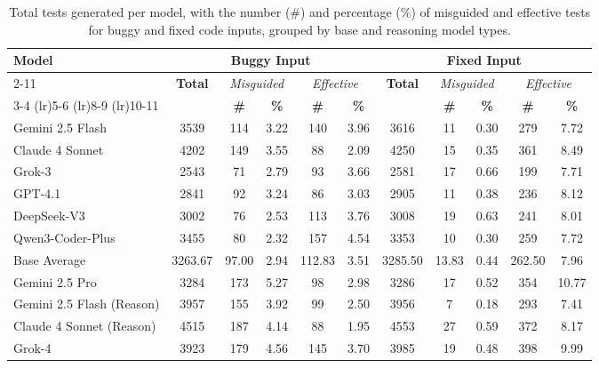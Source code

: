 \documentclass[acmsmall]{acmart}
\begin{document}
\begin{table}[htbp!]
\vspace{-0.5em}
\centering
\tiny
\caption{Total tests generated per model, with the number (\#) and percentage (\%) of misguided and effective tests for buggy and fixed code inputs, grouped by base and reasoning model types.}
\vspace{-0.4em}
\label{tab:misguidance_effect}
\begin{tabular}{l | c | cc | cc | c | cc | cc}
\toprule
\multirow{4}{*}{\textbf{Model}} & \multicolumn{5}{c|}{\textbf{Buggy Input}} & \multicolumn{5}{c}{\textbf{Fixed Input}} \\
\cmidrule{2-11}
& \multirow{2}{*}{\textbf{Total}} & \multicolumn{2}{c|}{\emph{Misguided}} & \multicolumn{2}{c|}{\emph{Effective}} & \multirow{2}{*}{\textbf{Total}} & \multicolumn{2}{c|}{\emph{Misguided}} & \multicolumn{2}{c}{\emph{Effective}}\\
\cmidrule(lr){3-4} \cmidrule(lr){5-6} \cmidrule(lr){8-9} \cmidrule(lr){10-11}
& & \textbf{\#} & \textbf{\%} & \textbf{\#} & \textbf{\%} & & \textbf{\#} & \textbf{\%} & \textbf{\#} & \textbf{\%} \\
\midrule
Gemini 2.5 Flash & 3539 & 114 & 3.22 & 140 & 3.96 & 3616 & 11 & 0.30 & 279 & 7.72 \\
Claude 4 Sonnet & 4202 & 149 & 3.55 & 88 & 2.09 & 4250 & 15 & 0.35 & 361 & 8.49 \\
Grok-3 & 2543 & 71 & 2.79 & 93 & 3.66 & 2581 & 17 & 0.66 & 199 & 7.71 \\
GPT-4.1 & 2841 & 92 & 3.24 & 86 & 3.03 & 2905 & 11 & 0.38 & 236 & 8.12 \\
DeepSeek-V3 & 3002 & 76 & 2.53 & 113 & 3.76 & 3008 & 19 & 0.63 & 241 & 8.01 \\
Qwen3-Coder-Plus & 3455 & 80 & 2.32 & 157 & 4.54 & 3353 & 10 & 0.30 & 259 & 7.72 \\
\midrule
Base Average & 3263.67 & 97.00 & 2.94 & 112.83 & 3.51 & 3285.50 & 13.83 & 0.44 & 262.50 & 7.96 \\
\midrule
Gemini 2.5 Pro & 3284 & 173 & 5.27 & 98 & 2.98 & 3286 & 17 & 0.52 & 354 & 10.77 \\
Gemini 2.5 Flash (Reason) & 3957 & 155 & 3.92 & 99 & 2.50 & 3956 & 7 & 0.18 & 293 & 7.41 \\
Claude 4 Sonnet (Reason) & 4515 & 187 & 4.14 & 88 & 1.95 & 4553 & 27 & 0.59 & 372 & 8.17 \\
Grok-4 & 3923 & 179 & 4.56 & 145 & 3.70 & 3985 & 19 & 0.48 & 398 & 9.99 \\

\end{tabular}
\end{table}
\end{document}
